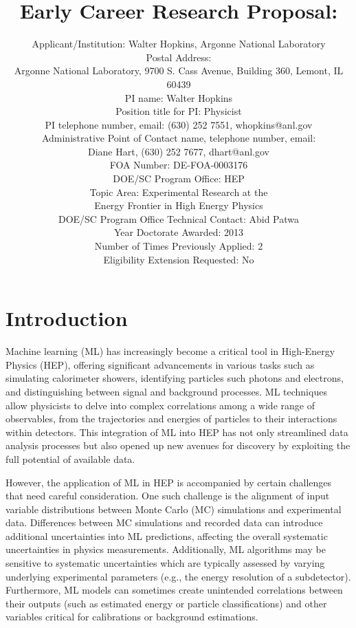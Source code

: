 \documentclass[letter, USenglish, 11pt, subfigure]{article}
\title{Early Career Research Proposal: \\}
\author{Applicant/Institution: Walter Hopkins, Argonne National Laboratory\\ Postal Address: \\Argonne National Laboratory, 9700 S. Cass Avenue, Building 360, Lemont, IL 60439
  \\PI name: Walter Hopkins\\Position title for PI: Physicist\\PI telephone number, email: (630) 252 7551, whopkins@anl.gov\\Administrative Point of Contact name, telephone number, email:\\Diane Hart, (630) 252 7677, dhart@anl.gov\\FOA Number: DE-FOA-0003176\\DOE/SC Program Office: HEP\\ Topic Area: Experimental Research at the \\Energy Frontier in High Energy Physics\\DOE/SC Program Office Technical Contact: Abid Patwa\\Year Doctorate Awarded: 2013\\Number of Times Previously Applied: 2\\Eligibility Extension Requested: No
}
\date{}
\begin{document}
% 

\clearpage
\tableofcontents
\thispagestyle{empty}

\clearpage
{} 


\section{Introduction}

Machine learning (ML) has increasingly become a critical tool in High-Energy Physics (HEP), offering significant advancements in various tasks such as simulating calorimeter showers, identifying particles such photons and electrons, and distinguishing between signal and background processes. ML techniques allow physicists to delve into complex correlations among a wide range of observables, from the trajectories and energies of particles to their interactions within detectors. This integration of ML into HEP has not only streamlined data analysis processes but also opened up new avenues for discovery by exploiting the full potential of available data.

However, the application of ML in HEP is accompanied by certain challenges that need careful consideration. One such challenge is the alignment of input variable distributions between Monte Carlo (MC) simulations and experimental data. Differences between MC simulations and recorded data can introduce additional uncertainties into ML predictions, affecting the overall systematic uncertainties in physics measurements. Additionally, ML algorithms may be sensitive to systematic uncertainties which are typically assessed by varying underlying experimental parameters (e.g., the energy resolution of a subdetector).
Furthermore, ML models can sometimes create unintended correlations between their outputs (such as estimated energy or particle classifications) and other variables critical for calibrations or background estimations.
\end{document}
